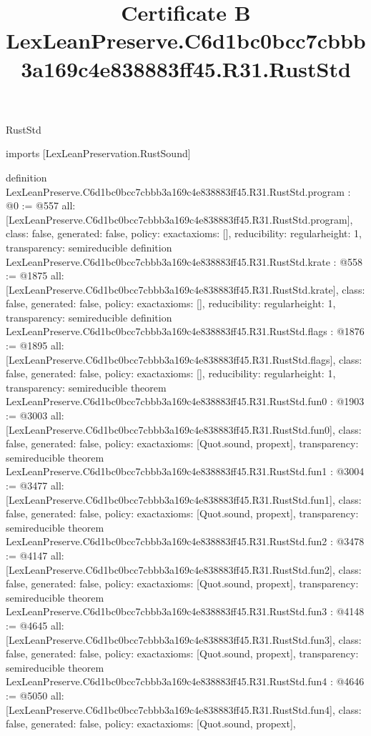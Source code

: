 \begin{lexlean}{RustStd}
\title{Certificate B LexLeanPreserve.C6d1bc0bcc7cbbb3a169c4e838883ff45.R31.RustStd}
\begin{coremodule}
imports [LexLeanPreservation.RustSound]

definition LexLeanPreserve.C6d1bc0bcc7cbbb3a169c4e838883ff45.R31.RustStd.program : @0 := @557 {
  all: [LexLeanPreserve.C6d1bc0bcc7cbbb3a169c4e838883ff45.R31.RustStd.program],
  class: false,
  generated: false,
  policy: exact{axioms: []},
  reducibility: regular{height: 1},
  transparency: semireducible
}
definition LexLeanPreserve.C6d1bc0bcc7cbbb3a169c4e838883ff45.R31.RustStd.krate : @558 := @1875 {
  all: [LexLeanPreserve.C6d1bc0bcc7cbbb3a169c4e838883ff45.R31.RustStd.krate],
  class: false,
  generated: false,
  policy: exact{axioms: []},
  reducibility: regular{height: 1},
  transparency: semireducible
}
definition LexLeanPreserve.C6d1bc0bcc7cbbb3a169c4e838883ff45.R31.RustStd.flags : @1876 := @1895 {
  all: [LexLeanPreserve.C6d1bc0bcc7cbbb3a169c4e838883ff45.R31.RustStd.flags],
  class: false,
  generated: false,
  policy: exact{axioms: []},
  reducibility: regular{height: 1},
  transparency: semireducible
}
theorem LexLeanPreserve.C6d1bc0bcc7cbbb3a169c4e838883ff45.R31.RustStd.fun0 : @1903 := @3003 {
  all: [LexLeanPreserve.C6d1bc0bcc7cbbb3a169c4e838883ff45.R31.RustStd.fun0],
  class: false,
  generated: false,
  policy: exact{axioms: [Quot.sound, propext]},
  transparency: semireducible
}
theorem LexLeanPreserve.C6d1bc0bcc7cbbb3a169c4e838883ff45.R31.RustStd.fun1 : @3004 := @3477 {
  all: [LexLeanPreserve.C6d1bc0bcc7cbbb3a169c4e838883ff45.R31.RustStd.fun1],
  class: false,
  generated: false,
  policy: exact{axioms: [Quot.sound, propext]},
  transparency: semireducible
}
theorem LexLeanPreserve.C6d1bc0bcc7cbbb3a169c4e838883ff45.R31.RustStd.fun2 : @3478 := @4147 {
  all: [LexLeanPreserve.C6d1bc0bcc7cbbb3a169c4e838883ff45.R31.RustStd.fun2],
  class: false,
  generated: false,
  policy: exact{axioms: [Quot.sound, propext]},
  transparency: semireducible
}
theorem LexLeanPreserve.C6d1bc0bcc7cbbb3a169c4e838883ff45.R31.RustStd.fun3 : @4148 := @4645 {
  all: [LexLeanPreserve.C6d1bc0bcc7cbbb3a169c4e838883ff45.R31.RustStd.fun3],
  class: false,
  generated: false,
  policy: exact{axioms: [Quot.sound, propext]},
  transparency: semireducible
}
theorem LexLeanPreserve.C6d1bc0bcc7cbbb3a169c4e838883ff45.R31.RustStd.fun4 : @4646 := @5050 {
  all: [LexLeanPreserve.C6d1bc0bcc7cbbb3a169c4e838883ff45.R31.RustStd.fun4],
  class: false,
  generated: false,
  policy: exact{axioms: [Quot.sound, propext]},
}
\end{coremodule}
\end{lexlean}
